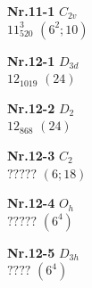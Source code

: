 \documentclass[12pt]{article}
\begin{document}
\begin{remark!!}
{\begin{minipage}[t]{3.5cm}
{{\bf Nr.11-1} \quad $C_{2v}$\\ $11^3_{520}$ \quad $(6^2;10)$\\\vspace{3mm} }
\end{minipage}
\setlength{\unitlength}{1cm}
\begin{minipage}[t]{3.5cm}
\centering
\epsfxsize=2.2cm
\par
{{\bf Nr.12-1} \quad $D_{3d}$\\ $12_{1019}$ \quad $(24)$\\\vspace{3mm} }
\end{minipage}
\setlength{\unitlength}{1cm}
\begin{minipage}[t]{3.5cm}
\centering
\epsfxsize=2.5cm
\par
{{\bf Nr.12-2} \quad $D_2$\\ $12_{868}$ \quad $(24)$\\\vspace{3mm} }
\end{minipage}
\setlength{\unitlength}{1cm}
\begin{minipage}[t]{3.5cm}
\centering
\epsfxsize=2.5cm
\par
{{\bf Nr.12-3} \quad $C_2$\\ $?????$ \quad $(6;18)$\\\vspace{3mm} }
\end{minipage}
\setlength{\unitlength}{1cm}
\begin{minipage}[t]{3.5cm}
\centering
\epsfxsize=2.5cm
\par
{{\bf Nr.12-4} \quad $O_h$\\ $?????$ \quad $(6^4)$\\\vspace{3mm} }
\end{minipage}
\setlength{\unitlength}{1cm}
\begin{minipage}[t]{3.5cm}
\centering
\epsfxsize=2.2cm
\par
{{\bf Nr.12-5} \quad $D_{3h}$\\ $????$ \quad $(6^4)$\\\vspace{3mm} }
\end{minipage}
}







\end{remark!!}
\end{document}
